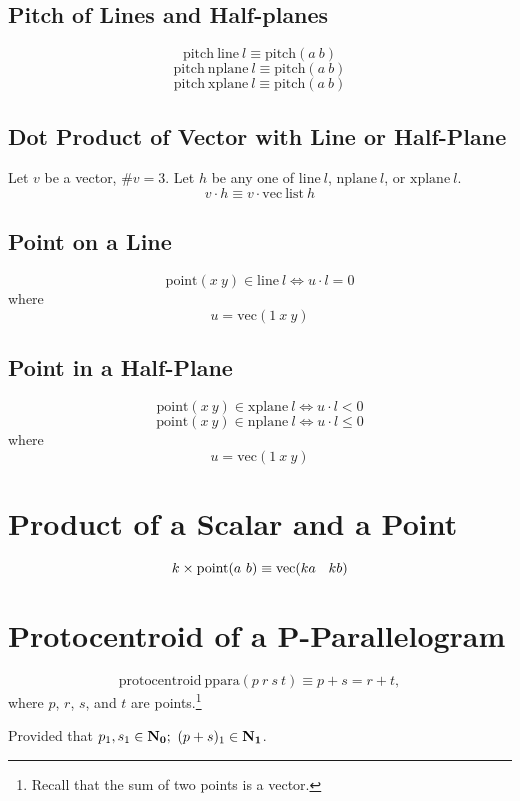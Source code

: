 \documentclass{article}
\begin{document}
\subsection{Pitch of Lines and Half-planes}

$$\mathrm{pitch\ line}\ l\equiv \mathrm{pitch}(a\ b)$$
$$\mathrm{pitch\ nplane}\ l\equiv \mathrm{pitch}(a\ b)$$
$$\mathrm{pitch\ xplane}\ l\equiv \mathrm{pitch}(a\ b)$$

\subsection{Dot Product of Vector with Line or Half-Plane}

Let $v$ be a vector, $\#v=3$.
Let $h$ be any one of $\mathrm{line}\ l$, $\mathrm{nplane}\ l$, or $\mathrm{xplane}\ l$.
$$v\cdot h\equiv v\cdot \mathrm{vec\ list}\ h$$

\subsection{Point on a Line}

$$\mathrm{point}(x\ y)\in \mathrm{line}\ l\Leftrightarrow u\cdot l=0$$
where
$$u=\mathrm{vec}(1\ x\ y)$$

\subsection{Point in a Half-Plane}

$$\mathrm{point}(x\ y)\in \mathrm{xplane}\ l\Leftrightarrow u\cdot l  < 0$$
$$\mathrm{point}(x\ y)\in \mathrm{nplane}\ l\Leftrightarrow u\cdot l\le 0$$
where
$$u=\mathrm{vec}(1\ x\ y)$$

\section{Product of a Scalar and a Point}

$$k\times \mathrm{point}(a\ b)\equiv \mathrm{vec}(ka\en kb)$$

\section{Protocentroid of a P-Parallelogram}

$$\mathrm{protocentroid\ ppara}(p\ r\ s\ t)\equiv p+s=r+t,$$
where $p$, $r$, $s$, and $t$ are points.\footnote{Recall
that the sum of two points is a vector.}

Provided that
$p_1, s_1\in\mathbf{N_0};$
$(p + s)_1\in\mathbf{N_1}$.
\end{document}
